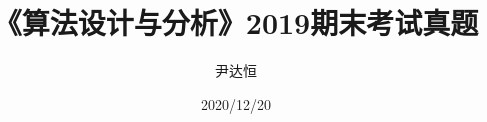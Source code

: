 \documentclass[a4paper]{ctexart}
\title{《算法设计与分析》2019期末考试真题}
\author{尹达恒}
\date{2020/12/20}
\begin{document}
\begin{titlepage}
\maketitle
\end{titlepage}








\end{document}
